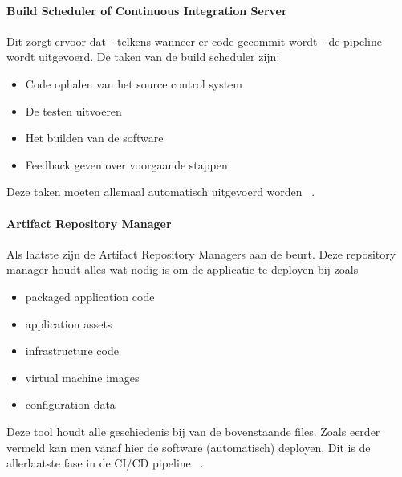     \paragraph{Build Scheduler of Continuous Integration Server}
    Dit zorgt ervoor dat - telkens wanneer er code gecommit wordt - de pipeline wordt uitgevoerd. De taken van de build scheduler zijn: 
    \begin{itemize}
        \item Code ophalen van het source control system
        \item De testen uitvoeren
        \item Het builden van de software
        \item Feedback geven over voorgaande stappen
    \end{itemize}
    Deze taken moeten allemaal automatisch uitgevoerd worden ~\autocite{Riti2018}. 
    
    \paragraph{Artifact Repository Manager}
    Als laatste zijn de Artifact Repository Managers aan de beurt. Deze repository manager houdt alles wat nodig is om de applicatie te deployen bij zoals
    \begin{itemize}
        \item packaged application code
        \item application assets
        \item infrastructure code
        \item virtual machine images
        \item configuration data
    \end{itemize}
    Deze tool houdt alle geschiedenis bij van de bovenstaande files. Zoals eerder vermeld kan men vanaf hier de software (automatisch) deployen. Dit is de allerlaatste fase in de CI/CD pipeline ~\autocite{Skelton2014}.
    
